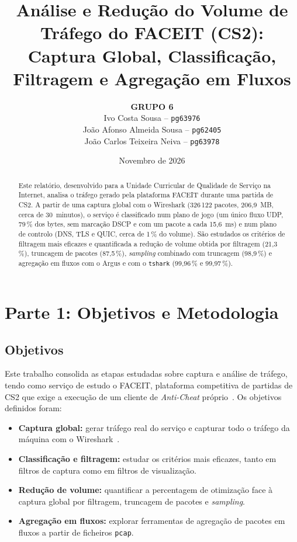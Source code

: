 \documentclass[11pt,a4paper]{article}
\title{\textbf{Análise e Redução do Volume de Tráfego do FACEIT (CS2): Captura Global, Classificação, Filtragem e Agregação em Fluxos}}
\author{\textbf{GRUPO 6}\\[1.2ex]
Ivo Costa Sousa -- \texttt{pg63976}\\
João Afonso Almeida Sousa -- \texttt{pg62405}\\
João Carlos Teixeira Neiva -- \texttt{pg63978}}
\date{Novembro de 2026}
\begin{document}
\maketitle

\begin{abstract}
Este relatório, desenvolvido para a Unidade Curricular de Qualidade de Serviço na Internet, analisa o tráfego gerado pela
plataforma FACEIT durante uma partida de CS2. A partir de uma captura global com o Wireshark (326\,122 pacotes, 206,9~MB,
cerca de 30~minutos), o serviço é classificado num plano de jogo (um único fluxo UDP, 79\,\% dos bytes, sem marcação DSCP e com
um pacote a cada 15,6~ms) e num plano de controlo (DNS, TLS e QUIC, cerca de 1\,\% do volume). São estudados os critérios de
filtragem mais eficazes e quantificada a redução de volume obtida por filtragem (21,3\,\%), truncagem de pacotes (87,5\,\%),
\emph{sampling} combinado com truncagem (98,9\,\%) e agregação em fluxos com o Argus e com o \texttt{tshark} (99,96\,\% e 99,97\,\%).
\end{abstract}

\section{Parte 1: Objetivos e Metodologia}

\subsection{Objetivos}
Este trabalho consolida as etapas estudadas sobre captura e análise de tráfego, tendo como serviço de estudo o FACEIT,
plataforma competitiva de partidas de CS2 que exige a execução de um cliente de \emph{Anti-Cheat} próprio~\cite{faceitac}.
Os objetivos definidos foram:
\begin{itemize}
  \item \textbf{Captura global:} gerar tráfego real do serviço e capturar todo o tráfego da máquina com o Wireshark~\cite{wsug}.
  \item \textbf{Classificação e filtragem:} estudar os critérios mais eficazes, tanto em filtros de captura como em filtros
        de visualização.
  \item \textbf{Redução de volume:} quantificar a percentagem de otimização face à captura global por filtragem, truncagem de
        pacotes e \emph{sampling}.
  \item \textbf{Agregação em fluxos:} explorar ferramentas de agregação de pacotes em fluxos a partir de ficheiros \texttt{pcap}.
\end{itemize}
\end{document}
